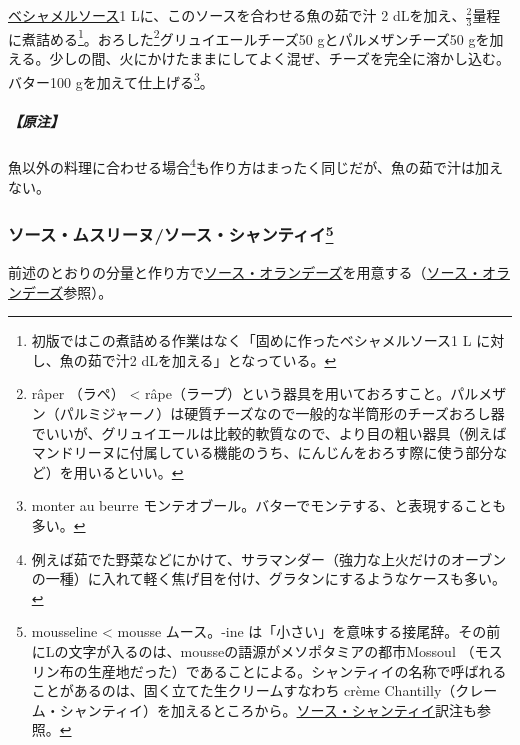 \begin{recette}
\protect\hyperlink{sauce-bechamel}{ベシャメルソース}1
Lに、このソースを合わせる魚の茹で汁 2
dLを加え、\(\frac{2}{3}\)量程に煮詰める\footnote{初版ではこの煮詰める作業はなく「固めに作ったベシャメルソース1
  L に対し、魚の茹で汁2 dLを加える」となっている。}。おろした\footnote{râper
  （ラペ） \textless{}
  râpe（ラープ）という器具を用いておろすこと。パルメザン（パルミジャーノ）は硬質チーズなので一般的な半筒形のチーズおろし器でいいが、グリュイエールは比較的軟質なので、より目の粗い器具（例えばマンドリーヌに付属している機能のうち、にんじんをおろす際に使う部分など）を用いるといい。}グリュイエールチーズ50
gとパルメザンチーズ50
gを加える。少しの間、火にかけたままにしてよく混ぜ、チーズを完全に溶かし込む。バター100
gを加えて仕上げる\footnote{monter au beurre
  モンテオブール。バターでモンテする、と表現することも多い。}。

\hypertarget{nota-sauce-mornay}{%
\subparagraph{【原注】}\label{nota-sauce-mornay}}

魚以外の料理に合わせる場合\footnote{例えば茹でた野菜などにかけて、サラマンダー（強力な上火だけのオーブンの一種）に入れて軽く焦げ目を付け、グラタンにするようなケースも多い。}も作り方はまったく同じだが、魚の茹で汁は加えない。

\hypertarget{sauce-mousseline}{%
\subsubsection[ソース・ムスリーヌ/ソース・シャンティイ]{\texorpdfstring{ソース・ムスリーヌ/ソース・シャンティイ\footnote{mousseline
  \textless{} mousse ムース。-ine
  は「小さい」を意味する接尾辞。その前にLの文字が入るのは、mousseの語源がメソポタミアの都市Mossoul
  （モスリン布の生産地だった）であることによる。シャンティイの名称で呼ばれることがあるのは、固く立てた生クリームすなわち
  crème
  Chantilly（クレーム・シャンティイ）を加えるところから。\protect\hyperlink{sauce-chantilly}{ソース・シャンティイ}訳注も参照。}}{ソース・ムスリーヌ/ソース・シャンティイ}}\label{sauce-mousseline}}



前述のとおりの分量と作り方で\protect\hyperlink{sauce-hollandaise}{ソース・オランデーズ}を用意する（\protect\hyperlink{sauce-hollandaise}{ソース・オランデーズ}参照）。


\end{recette}
